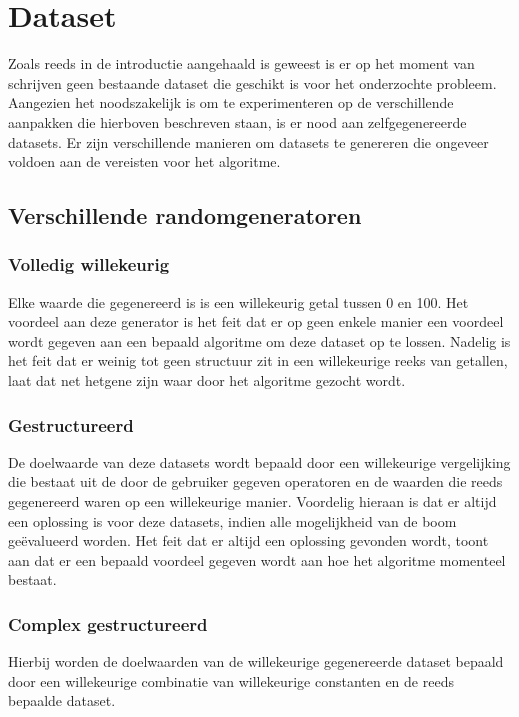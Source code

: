 \documentclass[Main.tex]{subfiles}
\begin{document}
\section{Dataset}

Zoals reeds in de introductie aangehaald is geweest is er op het moment van schrijven geen bestaande dataset die geschikt is voor het onderzochte probleem. Aangezien het noodszakelijk is om te experimenteren op de verschillende aanpakken die hierboven beschreven staan, is er nood aan zelfgegenereerde datasets. Er zijn verschillende manieren om datasets te genereren die ongeveer voldoen aan de vereisten voor het algoritme.
  
\subsection{Verschillende randomgeneratoren}
\subsubsection*{Volledig willekeurig}
Elke waarde die gegenereerd is is een willekeurig getal tussen 0 en 100. Het voordeel aan deze generator is het feit dat er op geen enkele manier een voordeel wordt gegeven aan een bepaald algoritme om deze dataset op te lossen. Nadelig is het feit dat er weinig tot geen structuur zit in een willekeurige reeks van getallen, laat dat net hetgene zijn waar door het algoritme gezocht wordt.

\subsubsection*{Gestructureerd}
De doelwaarde van deze datasets wordt bepaald door een willekeurige vergelijking die bestaat uit de door de gebruiker gegeven operatoren en de waarden die reeds gegenereerd waren op een willekeurige manier. Voordelig hieraan is dat er altijd een oplossing is voor deze datasets, indien alle mogelijkheid van de boom ge\"evalueerd worden. Het feit dat er altijd een oplossing gevonden wordt, toont aan dat er een bepaald voordeel gegeven wordt aan hoe het algoritme momenteel bestaat.

\subsubsection*{Complex gestructureerd}
Hierbij worden de doelwaarden van de willekeurige gegenereerde dataset bepaald door een willekeurige combinatie van willekeurige constanten en de reeds bepaalde dataset. %
\end{document}
